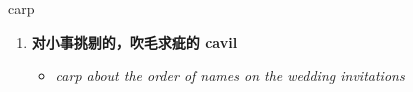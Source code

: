 
\begin{frame}
{\huge carp}
\begin{center}
\begin{enumerate}\Large
  \item \textbf{对小事挑剔的，吹毛求疵的 cavil}
  \begin{itemize}
    \item \em{\Large{carp about the order of names on the wedding invitations}}
  \end{itemize}
\end{enumerate}
\end{center}
\end{frame}
